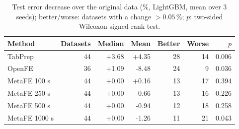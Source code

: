 \begin{table}[t]
\centering
\caption{Test error decrease over the original data (\%, LightGBM, mean over 3 seeds); better/worse: datasets with a change $>0.05$\,\%; $p$: two-sided Wilcoxon signed-rank test.}
\label{tab:fe}
\begin{tabular}{lrrrrrr}
\hline
Method & Datasets & Median & Mean & Better & Worse & $p$ \\
\hline
TabPrep & 44 & +3.68 & +4.35 & 28 & 14 & 0.006 \\
OpenFE & 36 & +1.09 & -8.48 & 24 & 9 & 0.036 \\
MetaFE 100 s & 44 & +0.00 & +0.16 & 13 & 17 & 0.394 \\
MetaFE 250 s & 44 & +0.00 & -0.66 & 13 & 16 & 0.226 \\
MetaFE 500 s & 44 & +0.00 & -0.94 & 12 & 18 & 0.258 \\
MetaFE 1000 s & 44 & +0.00 & -1.26 & 11 & 21 & 0.043 \\
\hline
\end{tabular}
\end{table}
